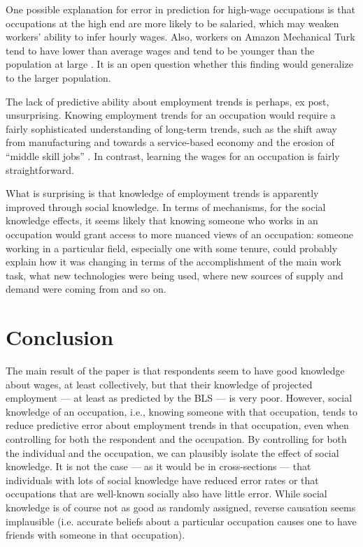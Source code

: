 \documentclass[12pt]{article}
\begin{document}
One possible explanation for error in prediction for high-wage occupations is that occupations at the high end are more likely to be salaried, which may weaken workers' ability to infer hourly wages. 
Also, workers on Amazon Mechanical Turk tend to have lower than average wages and tend to be younger than the population at large \citep{Berinsky2012, ipeirotis2010demographics}. 
It is an open question whether this finding would generalize to the larger population. 

The lack of predictive ability about employment trends is perhaps, ex post, unsurprising. 
Knowing employment trends for an occupation would require a fairly sophisticated understanding of long-term trends, such as the shift away from manufacturing and towards a service-based economy and the erosion of ``middle skill jobs'' \citep{autor1998computing}.  
In contrast, learning the wages for an occupation is fairly straightforward. 

What is surprising is that knowledge of employment trends is apparently improved through social knowledge. 
In terms of mechanisms, for the social knowledge effects, it seems likely that knowing someone who works in an occupation would grant access to more nuanced views of an occupation:
someone working in a particular field, especially one with some tenure, could probably explain how it was changing in terms of the accomplishment of the main work task, what new technologies were being used, where new sources of supply and demand were coming from and so on.  

\section{Conclusion} 

The main result of the paper is that respondents seem to have good knowledge about wages, at least collectively, but that their knowledge of projected employment --- at least as predicted by the BLS --- is very poor.
However, social knowledge of an occupation, i.e., knowing someone with that occupation, tends to reduce predictive error about employment trends in that occupation, even when controlling for both the respondent and the occupation. 
By controlling for both the individual and the occupation, we can plausibly isolate the effect of social knowledge. 
It is not the case --- as it would be in cross-sections --- that individuals with lots of social knowledge have reduced error rates or that occupations that are well-known socially also have little error. 
While social knowledge is of course not as good as randomly assigned, reverse causation seems implausible (i.e. accurate beliefs about a particular occupation causes one to have friends with someone in that occupation). 
\end{document}
